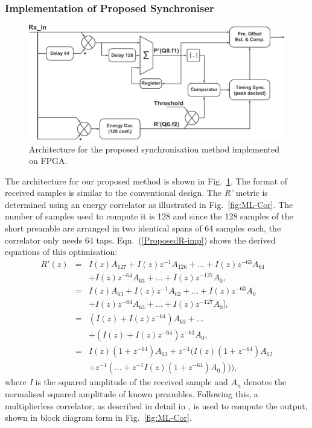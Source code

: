		\subsubsection{Implementation of Proposed Synchroniser}

\begin{figure}[h]
	\centerline{\includegraphics [width=0.8\columnwidth] {figures/Pro_Sync.pdf}}
	\caption{Architecture for the proposed synchronisation method implemented on FPGA.}
	\label{fig:Pro-Sync}
\end{figure}

The architecture for our proposed method is shown in Fig.~\ref{fig:Pro-Sync}.
The format of received samples is similar to the conventional design.
The \emph{R'} metric is determined using an energy correlator as illustrated in Fig.~\ref{fig:ML-Cor}.
The number of samples used to compute it is 128 and since the 128 samples of the short preamble are arranged in two identical spans of 64 samples each, the correlator only needs 64 taps.
Eqn.~(\ref{ProposedR-imp}) shows the derived equations of this optimisation:
\begin{eqnarray}
\label{ProposedR-imp}
R'(z) &=& I(z)A_{127} + I(z) z^{-1}A_{126} + ... + I(z) z^{-63}A_{64} \nonumber \\
	  &  &	+ I(z) z^{-64}A_{63} + ...+ I(z) z^{-127}A_0, \nonumber \\
	  &=& I(z)A_{63}   + I(z) z^{-1}A_{62}  +...+ I(z) z^{-63}A_0 \nonumber \\
	  &  &	+ I(z) z^{-64}A_{63} + ...+I(z) z^{-127} A_0], \nonumber \\
	  &=& (I(z)+I(z)z^{-64})A_{63} +... \nonumber \\
	  &  & 	+ (I(z)+I(z)z^{-64}) z^{-63}A_0, \nonumber \\
	  &=&I(z) (1+z^{-64})A_{63} +  z^{-1}(I(z)(1+z^{-64})A_{62}\nonumber \\
	  &	&						 + z^{-1 }( ...+z^{-1}I(z)(1+z^{-64})A_{0}))),
\end{eqnarray}
where \emph{I} is the squared amplitude of the received sample and $A_n$ denotes the normalised squared amplitude of known preambles.
Following this, a multiplierless correlator, as described in detail in \cite{Pham2012}, is used to compute the output, shown in block diagram form in Fig.~\ref{fig:ML-Cor}.

